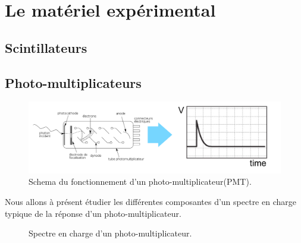 \section{Le matériel expérimental}

\subsection{Scintillateurs}

\subsection{Photo-multiplicateurs}

\begin{figure}
    \centering
	\includegraphics[width=\textwidth]{figures/PMT_readout.png}
    \caption{Schema du fonctionnement d'un photo-multiplicateur(PMT).}
    \label{fig:PMT_readout} 
\end{figure}

Nous allons à présent étudier les différentes composantes d'un spectre en charge typique de la réponse d'un photo-multiplicateur.\\

\begin{figure}[!h]
    \caption{\label{fig:spectre} Spectre en charge d'un photo-multiplicateur.}
\end{figure}

